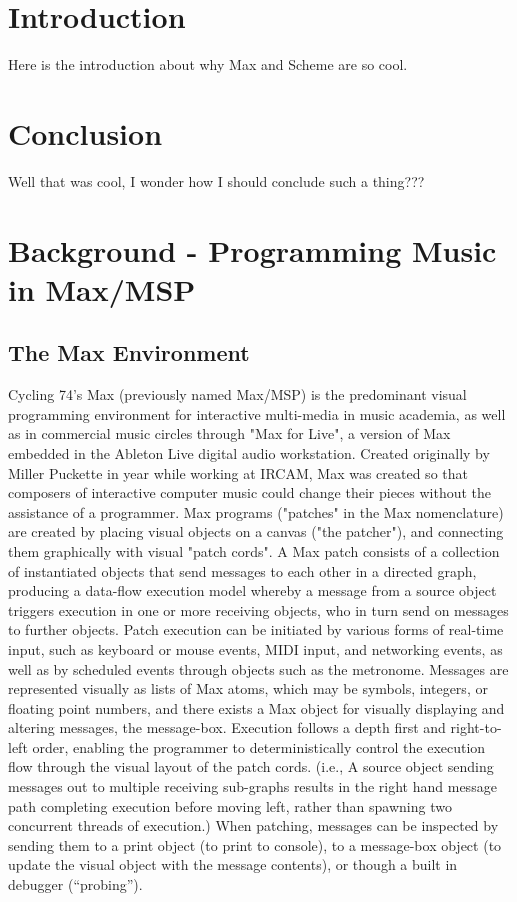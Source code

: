 \documentclass[acmsmall]{acmart}
\begin{document}
\maketitle

\section{Introduction}
Here is the introduction about why Max and Scheme are so cool.
\section{Conclusion}
Well that was cool, I wonder how I should conclude such a thing???

\section{Background - Programming Music in Max/MSP}

\subsection{The Max Environment}
Cycling 74’s Max (previously named Max/MSP) is the predominant visual programming environment 
for interactive multi-media in music academia, as well as in commercial music circles through "Max
for Live", a version of Max embedded in the Ableton Live digital audio workstation. Created 
originally by Miller Puckette in {year} while working at IRCAM, Max was created so that composers
of interactive computer music could change their pieces without the assistance of a programmer. Max 
programs ("patches" in the Max nomenclature) are created by placing visual objects on a canvas ("the 
patcher"), and connecting them graphically with visual "patch cords". A Max patch consists of a 
collection of instantiated objects that send messages to each other in a directed graph, producing a 
data-flow execution model whereby a message from a source object triggers execution in one or more 
receiving objects, who in turn send on messages to further objects. Patch execution can be initiated by 
various forms of real-time input, such as keyboard or mouse events, MIDI input, and networking 
events, as well as by scheduled events through objects such as the metronome. Messages are 
represented visually as lists of Max atoms, which may be symbols, integers, or floating point numbers, 
and there exists a Max object for visually displaying and altering messages, the message-box.  
Execution follows a depth first and right-to-left order, enabling the programmer to deterministically 
control the execution flow through the visual layout of the patch cords.  (i.e., A source object sending 
messages out to multiple receiving sub-graphs results in the right hand message path completing 
execution before moving left, rather than spawning two concurrent threads of execution.)  When 
patching, messages can be inspected by sending them to a print object (to print to console), to a 
message-box object (to update the visual object with the message contents), or though a built in 
debugger (“probing”).
\end{document}
